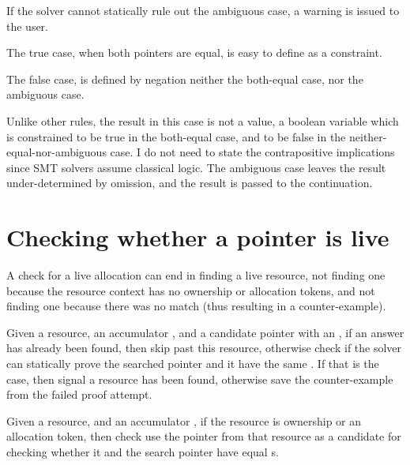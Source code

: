 
If the solver cannot statically rule out the ambiguous case, a warning is
issued to the user.


The true case, when both pointers are equal, is easy to define as a constraint.


The false case, is defined by negation \textemdash{} neither the both-equal
case, nor the ambiguous case.


Unlike other rules, the result in this case is not a value, a boolean variable
which is constrained to be true in the both-equal case, and to be false in the
neither-equal-nor-ambiguous case. I do not need to state the contrapositive
implications since SMT solvers assume classical logic. The ambiguous case
leaves the result under-determined by omission, and the result is passed to the
continuation.


\section{Checking whether a pointer is live}

A check for a live allocation can end in finding a live resource, not finding
one because the resource context has no ownership or allocation tokens, and not
finding one because there was no match (thus resulting in a counter-example).


Given a resource, an accumulator , and a candidate pointer
with an  , if an answer has already been
found, then skip past this resource, otherwise check if the solver can
statically prove the searched pointer  and it have the same
\@. If that is the case, then signal a resource has been found,
otherwise save the counter-example from the failed proof attempt.


Given a resource, and an accumulator , if the resource is
ownership or an allocation token, then check use the pointer from that resource
as a candidate for checking whether it and the search pointer have equal
s.

